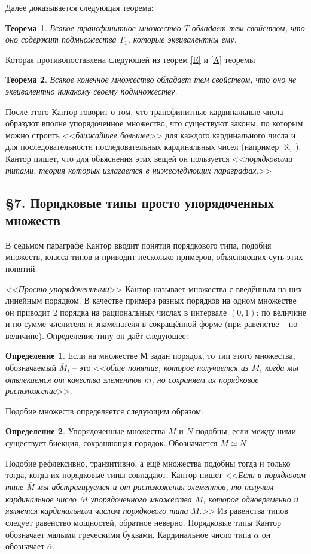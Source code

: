 \documentclass[a4paper,12pt]{extarticle}
\newtheorem{theorem}{Теорема}[subsection]
\theoremstyle{definition}
\newtheorem{definition}{Определение}
\newcommand{\cit}[1]{<<\textit{#1}>>}
\newcommand{\car}[1]{\overline{\overline{#1}}}
\begin{document}
Далее доказывается следующая теорема:
\begin{theorem}
    Всякое трансфинитное множество $T$ обладает тем свойством, что оно содержит подмножества $T_1$, которые эквивалентны ему.
\end{theorem}
Которая противопоставлена следующей из теорем \ref{E} и \ref{A} теоремы
\begin{theorem}
    Всякое конечное множество обладает тем свойством, что оно не эквивалентно никакому своему подмножеству.
\end{theorem}

После этого Кантор говорит о том, что трансфинитные кардинальные числа образуют вполне упорядоченное множество,
что существуют законы, по которым можно строить \cit{ближайшее большее} для каждого кардинального числа и
для последовательности последовательных кардинальных чисел (например $\aleph_{\omega}$).
Кантор пишет, что для объяснения этих вещей он пользуется \cit{порядковыми типами,
теория которых излагается в нижеследующих параграфах.}

\subsection{\S 7. Порядковые типы просто упорядоченных множеств}
В седьмом параграфе Кантор вводит понятия порядкового типа, подобия множеств, класса типов и приводит несколько примеров, объясняющих суть этих понятий.

\cit{Просто упорядоченными} Кантор называет множества с введённым на них линейным порядком.
В качестве примера разных порядков на одном множестве он приводит 2 порядка на рациональных числах в интервале $(0, 1)$:
по величине и по сумме числителя и знаменателя в сокращённой форме (при равенстве -- по величине).
Определение типу он даёт следующее:
\begin{definition}
    Если на множестве $М$ задан порядок, то тип этого множества, обозначаемый $\overline{M}$, -- это 
    \cit{обще понятие, которое получается из $M$, когда мы отвлекаемся от качества элементов $m$, но сохраняем их порядковое расположение}.
\end{definition}
Подобие множеств определяется следующим образом:
\begin{definition}
    Упорядоченные множества $M$ и $N$ подобны, если между ними существует биекция, сохраняющая порядок. Обозначается $M \simeq N$
\end{definition}
Подобие рефлексивно, транзитивно, а ещё множества подобны тогда и только тогда, когда их порядковые типы совпадают.
Кантор пишет \cit{Если в порядковом типе $\overline{M}$ мы абстрагируемся и от расположения элементов,
то получим кардинальное число $\car{M}$ упорядоченного множества $M$, которое одновременно и является кардинальным числом порядкового типа $\overline{M}$.}
Из равенства типов следует равенство мощностей, обратное неверно.
Порядковые типы Кантор обозначает малыми греческими буквами.
Кардинальное число типа $\alpha$ он обозначает $\overline{\alpha}$.
\end{document}
